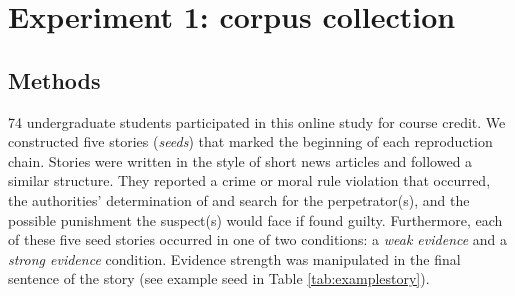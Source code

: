 \documentclass[10pt,letterpaper]{article}
\begin{document}
%
%


\section{Experiment 1: corpus collection}

\subsection{Methods}
74 undergraduate students participated in this online study for course credit. 
We constructed five stories (\textit{seeds}) that marked the beginning of each reproduction chain.  Stories were written in the style of short news articles and followed a similar structure. They reported a crime or moral rule violation that occurred, the authorities' determination of and search for the perpetrator(s), and the possible punishment the suspect(s) would face if found guilty. Furthermore, each of these five seed stories occurred in one of two conditions: a \emph{weak evidence} and a \emph{strong evidence} condition. Evidence strength was manipulated in the final sentence of the story (see example seed in Table \ref{tab:examplestory}).
\end{document}
